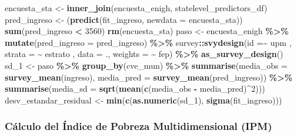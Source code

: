 \documentclass[
  12pt,
]{book}
\newenvironment{Shaded}{\begin{snugshade}}{\end{snugshade}}
\newcommand{\AttributeTok}[1]{\textcolor[rgb]{0.13,0.29,0.53}{#1}}
\newcommand{\DecValTok}[1]{\textcolor[rgb]{0.00,0.00,0.81}{#1}}
\newcommand{\FunctionTok}[1]{\textcolor[rgb]{0.13,0.29,0.53}{\textbf{#1}}}
\newcommand{\NormalTok}[1]{#1}
\newcommand{\OtherTok}[1]{\textcolor[rgb]{0.56,0.35,0.01}{#1}}
\newcommand{\SpecialCharTok}[1]{\textcolor[rgb]{0.81,0.36,0.00}{\textbf{#1}}}
\begin{document}
\begin{Shaded}
\begin{Highlighting}[]
\NormalTok{encuesta\_sta }\OtherTok{\textless{}{-}} \FunctionTok{inner\_join}\NormalTok{(encuesta\_enigh, statelevel\_predictors\_df)}
\NormalTok{pred\_ingreso }\OtherTok{\textless{}{-}}\NormalTok{ (}\FunctionTok{predict}\NormalTok{(fit\_ingreso, }\AttributeTok{newdata =}\NormalTok{ encuesta\_sta))}
\FunctionTok{sum}\NormalTok{(pred\_ingreso }\SpecialCharTok{\textless{}} \DecValTok{3560}\NormalTok{)}
\FunctionTok{rm}\NormalTok{(encuesta\_sta)}
\NormalTok{paso }\OtherTok{\textless{}{-}}\NormalTok{ encuesta\_enigh }\SpecialCharTok{\%\textgreater{}\%} \FunctionTok{mutate}\NormalTok{(}\AttributeTok{pred\_ingreso =}\NormalTok{ pred\_ingreso) }\SpecialCharTok{\%\textgreater{}\%} 
\NormalTok{  survey}\SpecialCharTok{::}\FunctionTok{svydesign}\NormalTok{(}\AttributeTok{id =}\SpecialCharTok{\textasciitilde{}}\NormalTok{ upm , }\AttributeTok{strata =} \SpecialCharTok{\textasciitilde{}}\NormalTok{ estrato , }\AttributeTok{data =}\NormalTok{ ., }\AttributeTok{weights =} \SpecialCharTok{\textasciitilde{}}\NormalTok{ fep) }\SpecialCharTok{\%\textgreater{}\%} 
  \FunctionTok{as\_survey\_design}\NormalTok{()}
\NormalTok{sd\_1 }\OtherTok{\textless{}{-}}\NormalTok{ paso }\SpecialCharTok{\%\textgreater{}\%} \FunctionTok{group\_by}\NormalTok{(cve\_mun) }\SpecialCharTok{\%\textgreater{}\%} 
  \FunctionTok{summarise}\NormalTok{(}\AttributeTok{media\_obs =} \FunctionTok{survey\_mean}\NormalTok{(ingreso), }
            \AttributeTok{media\_pred =} \FunctionTok{survey\_mean}\NormalTok{(pred\_ingreso)) }\SpecialCharTok{\%\textgreater{}\%} 
  \FunctionTok{summarise}\NormalTok{(}\AttributeTok{media\_sd =} \FunctionTok{sqrt}\NormalTok{(}\FunctionTok{mean}\NormalTok{(}\FunctionTok{c}\NormalTok{(media\_obs }\SpecialCharTok{{-}}\NormalTok{ media\_pred)}\SpecialCharTok{\^{}}\DecValTok{2}\NormalTok{)))}
\NormalTok{desv\_estandar\_residual }\OtherTok{\textless{}{-}} \FunctionTok{min}\NormalTok{(}\FunctionTok{c}\NormalTok{(}\FunctionTok{as.numeric}\NormalTok{(sd\_1), }\FunctionTok{sigma}\NormalTok{(fit\_ingreso)))}
\end{Highlighting}
\end{Shaded}

\hypertarget{cuxe1lculo-del-uxedndice-de-pobreza-multidimensional-ipm-1}{%
\subsubsection*{Cálculo del Índice de Pobreza Multidimensional (IPM)}\label{cuxe1lculo-del-uxedndice-de-pobreza-multidimensional-ipm-1}}
\end{document}
